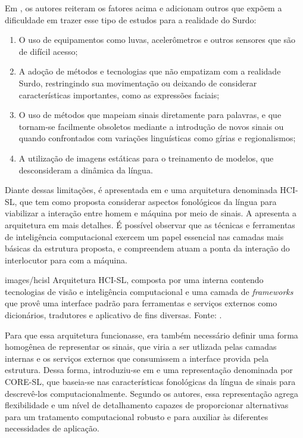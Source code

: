 Em \cite{antunes-hcisl-2011}, os autores reiteram os fatores acima e adicionam outros que expõem a dificuldade em trazer esse tipo de estudos para a realidade do Surdo: 
\begin{enumerate}
    \item O uso de equipamentos como luvas, acelerômetros e outros sensores que são de difícil acesso; 
    \item A adoção de métodos e tecnologias que não empatizam com a realidade Surdo, restringindo sua movimentação ou deixando de considerar características importantes, como as expressões faciais;
    \item O uso de métodos que mapeiam sinais diretamente para palavras, e que tornam-se facilmente obsoletos mediante a introdução de novos sinais ou quando confrontados com variações linguísticas como gírias e regionalismos; 
    \item A utilização de imagens estáticas para o treinamento de modelos, que desconsideram a dinâmica da língua.
\end{enumerate}

Diante dessas limitações, é apresentada em \cite{antunes-hcisl-2011} e \cite{garcia-2013} uma arquitetura denominada HCI-SL, que tem como proposta considerar aspectos fonológicos da língua para viabilizar a interação entre homem e máquina por meio de sinais. A  apresenta a arquitetura em mais detalhes. É possível observar que as técnicas e ferramentas de inteligência computacional exercem um papel essencial nas camadas mais básicas da estrutura proposta, e compreendem atuam a ponta da interação do interlocutor para com a máquina.

    {images/hcisl}
    {Arquitetura HCI-SL, composta por uma interna contendo tecnologias de visão e inteligência computacional e uma camada de \textit{frameworks} que provê uma interface padrão para ferramentas e serviços externos como dicionários, tradutores e aplicativo de fins diversas. Fonte: \cite{antunes-hcisl-2011}.}

Para que essa arquitetura funcionasse, era também necessário definir uma forma homogênea de representar os sinais, que viria a ser utlizada pelas camadas internas e os serviços externos que consumissem a interface provida pela estrutura. Dessa forma, introduziu-se em \cite{antunes-2011} e \cite{antunes-2015} uma representação denominada por CORE-SL, que baseia-se nas características fonológicas da língua de sinais para descrevê-los computacionalmente. Segundo os autores, essa representação agrega flexibilidade e um nível de detalhamento capazes de proporcionar alternativas para um tratamento computacional robusto e para auxiliar às diferentes necessidades de aplicação. 

